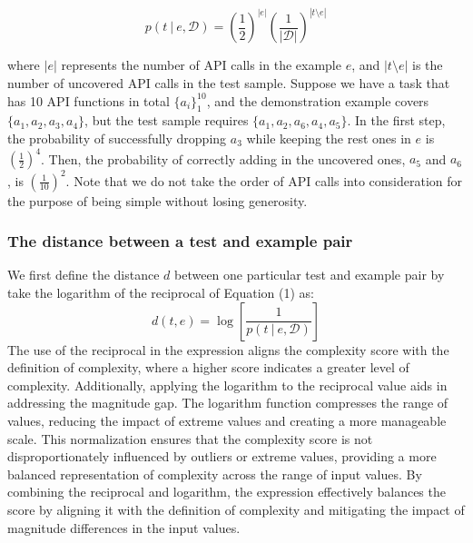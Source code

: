 
\begin{equation}
    \label{eq:equation1}
    p(t~|~e, \mathcal{D})=\left(\frac{1}{2}\right)^{|e|} \left(\frac{1}{|\mathcal{D}|}\right)^{|t \setminus e|}
\end{equation}

where $|e|$ represents the number of API calls in the example $e$, and $|t \setminus e|$ is the number of uncovered API calls in the test sample. Suppose we have a task that has 10 API functions in total $\{a_i\}_1^{10}$, and the demonstration example covers $\{a_1, a_2, a_3, a_4\}$, but the test sample requires $\{a_1, a_2, a_6, a_4, a_5\}$. In the first step, the probability of successfully dropping $a_3$ while keeping the rest ones in $e$ is $\left(\frac{1}{2}\right)^4$. Then, the probability of correctly adding in the uncovered ones, $a_5$ and $a_6$, is $\left(\frac{1}{10}\right)^2$. Note that we do not take the order of API calls into consideration for the purpose of being simple without losing generosity. 


\subsubsection{The distance between a test and example pair}
We first define the distance $d$ between one particular test and example pair by take the logarithm of the reciprocal of Equation (1) as:
\begin{equation}
    \label{eq:equation2}
    d(t, e) = \log\left[\frac{1}{p(t~|~e, \mathcal{D})}\right]
\end{equation}
The use of the reciprocal in the expression aligns the complexity score with the definition of complexity, where a higher score indicates a greater level of complexity. Additionally, applying the logarithm to the reciprocal value aids in addressing the magnitude gap. The logarithm function compresses the range of values, reducing the impact of extreme values and creating a more manageable scale. This normalization ensures that the complexity score is not disproportionately influenced by outliers or extreme values, providing a more balanced representation of complexity across the range of input values. By combining the reciprocal and logarithm, the expression effectively balances the score by aligning it with the definition of complexity and mitigating the impact of magnitude differences in the input values.

